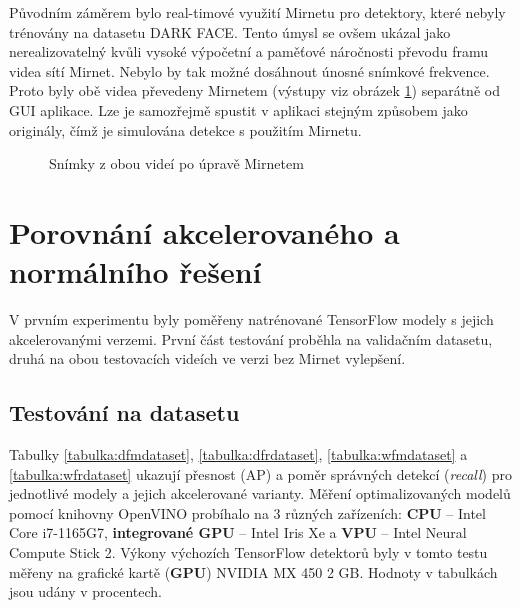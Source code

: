 Původním záměrem bylo real-timové využití Mirnetu pro detektory, které nebyly trénovány na datasetu DARK FACE. Tento úmysl se ovšem ukázal jako nerealizovatelný kvůli vysoké výpočetní a paměťové náročnosti převodu framu videa sítí Mirnet. Nebylo by tak možné dosáhnout únosné snímkové frekvence. Proto byly obě videa převedeny Mirnetem (výstupy viz obrázek \ref{obrazek:videamirnet}) separátně od GUI aplikace. Lze je samozřejmě spustit v aplikaci stejným způsobem jako originály, čímž je simulována detekce s použitím Mirnetu.

\begin{figure}[H] 
  \begin{center}
  \label{obrazek:videamirnet}
  \caption{Snímky z obou videí po úpravě Mirnetem}
  \end{center}
\end{figure}

\section{Porovnání akcelerovaného a normálního řešení}
V prvním experimentu byly poměřeny natrénované TensorFlow modely s jejich akcelerovanými verzemi. První část testování proběhla na validačním datasetu, druhá na obou testovacích videích ve verzi bez Mirnet vylepšení.

\subsection*{Testování na datasetu}
Tabulky \ref{tabulka:dfmdataset}, \ref{tabulka:dfrdataset}, \ref{tabulka:wfmdataset} a \ref{tabulka:wfrdataset} ukazují přesnost (AP) a poměr správných detekcí (\emph{recall}) pro jednotlivé modely a jejich akcelerované varianty. Měření optimalizovaných modelů pomocí knihovny OpenVINO probíhalo na 3 různých zařízeních: \textbf{CPU} -- Intel Core i7-1165G7, \textbf{integrované GPU} -- Intel Iris Xe a \textbf{VPU} -- Intel Neural Compute Stick 2. Výkony výchozích TensorFlow detektorů byly v tomto testu měřeny na grafické kartě (\textbf{GPU}) NVIDIA MX 450 2 GB. Hodnoty v tabulkách jsou udány v procentech.

